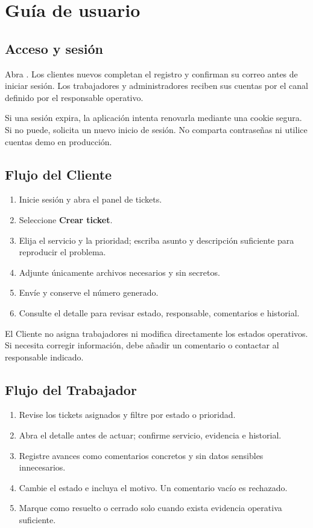 \chapter{Guía de usuario}

\section{Acceso y sesión}

Abra \href{\FrontendUrl}{\FrontendUrl}. Los clientes nuevos completan el registro y confirman su
correo antes de iniciar sesión. Los trabajadores y administradores reciben sus cuentas por el canal
definido por el responsable operativo.

Si una sesión expira, la aplicación intenta renovarla mediante una cookie segura. Si no puede,
solicita un nuevo inicio de sesión. No comparta contraseñas ni utilice cuentas demo en producción.

\section{Flujo del Cliente}

\begin{enumerate}
  \item Inicie sesión y abra el panel de tickets.
  \item Seleccione \textbf{Crear ticket}.
  \item Elija el servicio y la prioridad; escriba asunto y descripción suficiente para reproducir el
  problema.
  \item Adjunte únicamente archivos necesarios y sin secretos.
  \item Envíe y conserve el número generado.
  \item Consulte el detalle para revisar estado, responsable, comentarios e historial.
\end{enumerate}

El Cliente no asigna trabajadores ni modifica directamente los estados operativos. Si necesita
corregir información, debe añadir un comentario o contactar al responsable indicado.

\section{Flujo del Trabajador}

\begin{enumerate}
  \item Revise los tickets asignados y filtre por estado o prioridad.
  \item Abra el detalle antes de actuar; confirme servicio, evidencia e historial.
  \item Registre avances como comentarios concretos y sin datos sensibles innecesarios.
  \item Cambie el estado e incluya el motivo. Un comentario vacío es rechazado.
  \item Marque como resuelto o cerrado solo cuando exista evidencia operativa suficiente.
\end{enumerate}

